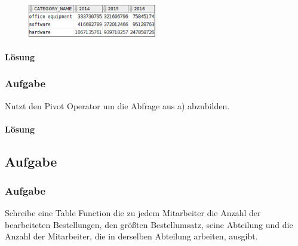 \begin{figure}[H]
  \centering
  \includegraphics[width=0.50\textwidth]{img//uebung_12_-_aufgabe_09a.png}
  \label{img:uebung_12_-_aufgabe_09a}
\end{figure}

\paragraph*{Lösung}
\label{subsubsec:uebung_12.aufgabe_09a.loesung}

\subsubsection{Aufgabe}
\label{subsec:uebung_12.aufgabe_09b}
Nutzt den Pivot Operator um die Abfrage aus a) abzubilden.

\paragraph*{Lösung}
\label{subsubsec:uebung_12.aufgabe_09b.loesung}


\subsection{Aufgabe}
\label{subsec:uebung_12.aufgabe_10}

\subsubsection{Aufgabe}
\label{subsubsec:uebung_12.aufgabe_10a}
Schreibe eine Table Function die zu jedem Mitarbeiter die Anzahl der bearbeiteten Bestellungen, den größten Bestellumsatz, seine Abteilung und die Anzahl der Mitarbeiter, die in derselben Abteilung arbeiten, ausgibt.


